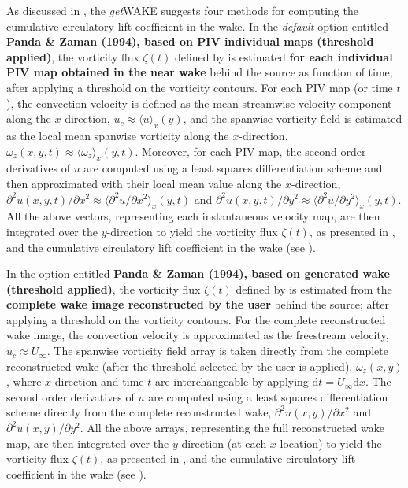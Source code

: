 \documentclass[12pt,a4paper]{article}
\begin{document}
As discussed in , the \textit{get}WAKE suggests four methods for computing the cumulative circulatory lift coefficient in the wake. 
In the \textit{default} option entitled \textbf{Panda \& Zaman (1994), based on PIV individual maps (threshold applied)}, the vorticity flux $\zeta(t)$ defined by  is estimated \textbf{for each individual PIV map obtained in the near wake} behind the source as function of time; after applying a threshold on the vorticity contours. 
For each PIV map (or time $t$), the convection velocity is defined as the mean streamwise velocity component along the $x$-direction, $u_c\approx\langle{u}\rangle_x(y)$, and the spanwise vorticity field is estimated as the local mean spanwise vorticity along the $x$-direction, $\omega_z(x,y,t)\approx\langle{\omega_z}\rangle_x(y,t)$. 
Moreover, for each PIV map, the second order derivatives of $u$ are computed using a least squares differentiation scheme and then approximated with their local mean value along the $x$-direction, $\partial^2u(x,y,t)/\partial x^2\approx\langle{\partial^2u/\partial x^2}\rangle_x(y,t)$ and $\partial^2u(x,y,t)/\partial y^2\approx\langle{\partial^2u/\partial y^2}\rangle_x(y,t)$.
All the above vectors, representing each instantaneous velocity map, are then integrated over the $y$-direction to yield the vorticity flux $\zeta(t)$, as presented in , and the cumulative circulatory lift coefficient in the wake (see ).

In the option entitled \textbf{Panda \& Zaman (1994), based on generated wake (threshold applied)}, the vorticity flux $\zeta(t)$ defined by  is estimated from the \textbf{complete wake image reconstructed by the user} behind the source; after applying a threshold on the vorticity contours. 
For the complete reconstructed wake image, the convection velocity is approximated as the freestream velocity, $u_c\approx U_\infty$. The spanwise vorticity field array is taken directly from the complete reconstructed wake (after the threshold selected by the user is applied), $\omega_z(x,y)$, where $x$-direction and time $t$ are interchangeable by applying $\mathrm{d}t=U_\infty\mathrm{d}x$.
The second order derivatives of $u$ are computed using a least squares differentiation scheme directly from the complete reconstructed wake, $\partial^2u(x,y)/\partial x^2$ and $\partial^2u(x,y)/\partial y^2$.
All the above arrays, representing the full reconstructed wake map, are then integrated over the $y$-direction (at each $x$ location) to yield the vorticity flux $\zeta(t)$, as presented in , and the cumulative circulatory lift coefficient in the wake (see ).
\end{document}
